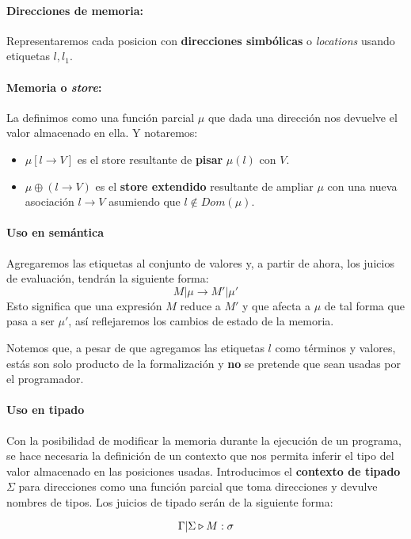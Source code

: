 \paragraph{Direcciones de memoria:} Representaremos cada posicion con \textbf{direcciones simbólicas} o \textit{locations} usando etiquetas $l,l_1$.

\paragraph{Memoria o \textit{store}:} La definimos como una función parcial $\mu$ que dada una dirección nos devuelve el valor almacenado en ella. Y notaremos:
\begin{itemize}
	\item $\mu[l\to V]$ es el store resultante de \textbf{pisar} $\mu(l)$ con $V$.
	\item $\mu\oplus(l\to V)$ es el \textbf{store extendido} resultante de ampliar $\mu$ con una nueva asociación $l \to V$ asumiendo que $l \notin Dom(\mu)$.    
\end{itemize}

\paragraph{Uso en semántica} Agregaremos las etiquetas al conjunto de valores y, a partir de ahora, los juicios de evaluación, tendrán la siguiente forma: 
$$M|\mu \to M'|\mu'$$
Esto significa que una expresión $M$ reduce a $M'$ y que afecta a $\mu$ de tal forma que pasa a ser $\mu'$, así reflejaremos los cambios de estado de la memoria.

Notemos que, a pesar de que agregamos las etiquetas $l$ como términos y valores, estás son solo producto de la formalización y \textbf{no} se pretende que sean usadas por el programador.

\paragraph{Uso en tipado} Con la posibilidad de modificar la memoria durante la ejecución de un programa, se hace necesaria la definición de un contexto que nos permita inferir el tipo del valor almacenado en las posiciones usadas. Introducimos el \textbf{contexto de tipado} $\Sigma$ para direcciones como una función parcial que toma direcciones y devulve nombres de tipos. Los juicios de tipado serán de la siguiente forma:

$$\Gamma|\Sigma\triangleright M : \sigma$$


